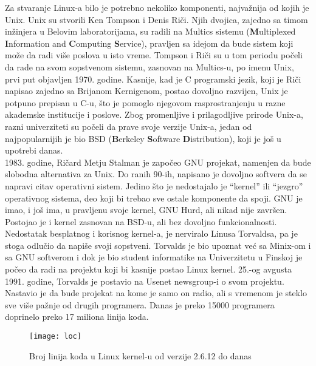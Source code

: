 \indent Za stvaranje Linux-a bilo je potrebno nekoliko komponenti, najvažnija od kojih je Unix. Unix su stvorili Ken Tompson i Denis Riči. Njih dvojica, zajedno sa timom inžinjera u Belovim laboratorijama, su radili na Multics sistemu (\textbf{M}ultiplexed \textbf{I}nformation and \textbf{C}omputing \textbf{S}ervice), pravljen sa idejom da bude sistem koji može da radi više poslova u isto vreme. Tompson i Riči su u  tom periodu počeli da rade na svom sopstvenom sistemu, zasnovan na Multics-u, po imenu Unix, prvi put objavljen 1970. godine. Kasnije, kad je C programski jezik, koji je Riči napisao zajedno sa Brijanom Kernigenom, postao dovoljno razvijen, Unix je potpuno prepisan u C-u, što je pomoglo njegovom rasprostranjenju u razne akademske institucije i poslove. Zbog promenljive i prilagodljive prirode Unix-a, razni univerziteti su počeli da prave svoje verzije Unix-a, jedan od najpopularnijih je bio BSD (\textbf{B}erkeley \textbf{S}oftware \textbf{D}istribution), koji je još u upotrebi danas.\\

1983. godine, Ričard Metju Stalman je započeo GNU projekat, namenjen da bude slobodna alternativa za Unix. Do ranih 90-ih, napisano je dovoljno softvera da se napravi citav operativni sistem. Jedino što je nedostajalo je ``kernel'' ili ``jezgro'' operativnog sistema, deo koji bi trebao sve ostale komponente da spoji. GNU je imao, i još ima, u pravljenu svoje kernel, GNU Hurd, ali nikad nije završen. Postojao je i kernel zasnovan na BSD-u, ali bez dovoljno funkcionalnosti.\\

Nedostatak besplatnog i korisnog kernel-a, je nerviralo Linusa Torvaldsa, pa je stoga odlučio da napiše svoji sopstveni. Torvalds je bio upoznat već sa Minix-om i sa GNU softverom i dok je bio student informatike na Univerzitetu u Finskoj je počeo da radi na projektu koji bi kasnije postao Linux kernel. 25.-og avgusta 1991. godine, Torvalds je postavio na Usenet newsgroup-i o svom projektu. Nastavio je da bude projekat na kome je samo on radio, ali s vremenom je steklo sve više pažnje od drugih programera. Danas je preko 15000 programera  doprinelo preko 17 miliona linija koda.
\newpage
\begin{figure}[h]
	\centering
    \hspace{1cm}
\end{figure}
\begin{figure}[h]
	\centering
    \hspace{1cm}
\end{figure}
\begin{figure}[H]
	\centering
	\texttt{[image: loc]}
	\caption{Broj linija koda u Linux kernel-u od verzije 2.6.12 do danas}
\end{figure}
\newpage